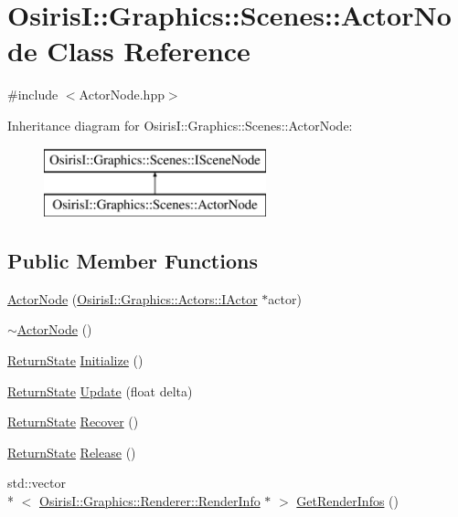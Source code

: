 \hypertarget{class_osiris_i_1_1_graphics_1_1_scenes_1_1_actor_node}{\section{Osiris\-I\-:\-:Graphics\-:\-:Scenes\-:\-:Actor\-Node Class Reference}
\label{class_osiris_i_1_1_graphics_1_1_scenes_1_1_actor_node}
}


{\ttfamily \#include $<$Actor\-Node.\-hpp$>$}

Inheritance diagram for Osiris\-I\-:\-:Graphics\-:\-:Scenes\-:\-:Actor\-Node\-:\begin{figure}[H]
\begin{center}
\leavevmode
\includegraphics[height=2.000000cm]{class_osiris_i_1_1_graphics_1_1_scenes_1_1_actor_node}
\end{center}
\end{figure}
\subsection*{Public Member Functions}
\begin{DoxyCompactItemize}
\item 
\hyperlink{class_osiris_i_1_1_graphics_1_1_scenes_1_1_actor_node_ad996c3e0b0423834c67adf9b88af12e4}{Actor\-Node} (\hyperlink{class_osiris_i_1_1_graphics_1_1_actors_1_1_i_actor}{Osiris\-I\-::\-Graphics\-::\-Actors\-::\-I\-Actor} $\ast$actor)
\item 
\hyperlink{class_osiris_i_1_1_graphics_1_1_scenes_1_1_actor_node_a487c975786f923ddaf4fe21d3a92bb85}{$\sim$\-Actor\-Node} ()
\item 
\hyperlink{namespace_osiris_i_a8f53bf938dc75c65c6a529694514013e}{Return\-State} \hyperlink{class_osiris_i_1_1_graphics_1_1_scenes_1_1_actor_node_adf7fbcf1c45b83906e64d79b52d8ed4a}{Initialize} ()
\item 
\hyperlink{namespace_osiris_i_a8f53bf938dc75c65c6a529694514013e}{Return\-State} \hyperlink{class_osiris_i_1_1_graphics_1_1_scenes_1_1_actor_node_a90881da17867a2d84f3a38376645f00d}{Update} (float delta)
\item 
\hyperlink{namespace_osiris_i_a8f53bf938dc75c65c6a529694514013e}{Return\-State} \hyperlink{class_osiris_i_1_1_graphics_1_1_scenes_1_1_actor_node_aed8ccb7eb69114f6895f073e20e5fcc0}{Recover} ()
\item 
\hyperlink{namespace_osiris_i_a8f53bf938dc75c65c6a529694514013e}{Return\-State} \hyperlink{class_osiris_i_1_1_graphics_1_1_scenes_1_1_actor_node_a2f03b8ff9815ca203e9145406315d05a}{Release} ()
\item 
std\-::vector\\*
$<$ \hyperlink{struct_osiris_i_1_1_graphics_1_1_renderer_1_1_render_info}{Osiris\-I\-::\-Graphics\-::\-Renderer\-::\-Render\-Info} $\ast$ $>$ \hyperlink{class_osiris_i_1_1_graphics_1_1_scenes_1_1_actor_node_a8124f2504a9599fd44eb0dd56affb5f3}{Get\-Render\-Infos} ()
\end{DoxyCompactItemize}
